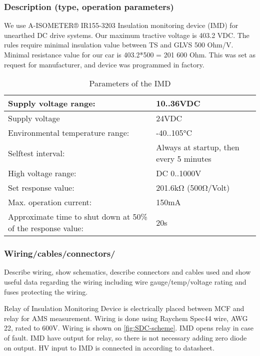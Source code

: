 \subsubsection{Description (type, operation parameters)}
\iffalse Describe the IMD used and use a table for the common operation parameters, like supply voltage, set point, etc. Also, describe how the IMD indicator light is wired, etc.
Additionally, fill out the following table replacing the values with your specification:\fi

We use A-ISOMETER® IR155-3203 Insulation monitoring device (IMD) for unearthed DC drive systems. Our maximum tractive voltage is 403.2 VDC. The rules require minimal insulation value between TS and GLVS 500 Ohm/V. Minimal resistance value for our car is 403.2*500 = 201 600 Ohm. This was set as request for manufacturer, and device was programmed in factory.
\begin{table}[H]
	\centering
	\caption{Parameters of the IMD}
	\begin{tabu}{|X|l|}
	 \hline	Supply voltage range: & 10..36VDC \\[.4cm]
	 \hline	Supply voltage & 24VDC \\[.4cm]
	 \hline	Environmental temperature range: & -40..105°C \\[.4cm]
	 \hline	Selftest interval: & Always at startup, then every 5 minutes \\[.4cm]
	 \hline	High voltage range: & DC 0..1000V \\[.4cm]
	 \hline	Set response value: & 201.6kΩ (500Ω/Volt) \\[.4cm]
	 \hline	Max. operation current: & 150mA \\[.4cm]
	 \hline	Approximate time to shut down at 50\% of the response value: & 20s \\[.4cm]
	  \hline
	\end{tabu}%
	\label{tab:IMD}%
\end{table}%

\subsubsection{Wiring/cables/connectors/}
 Describe wiring, show schematics, describe connectors and cables used and show useful data regarding the wiring including wire gauge/temp/voltage rating and fuses protecting the wiring. 

Relay of Insulation Monitoring Device is electrically placed between MCF and relay for AMS measurement. Wiring is done using Raychem Spec44 wire, AWG 22, rated to 600V. Wiring is shown on \ref{fig:SDC-scheme}. IMD opens relay in case of fault. IMD have output for relay, so there is not necessary adding zero diode on output. HV input to IMD is connected in according to datasheet.

